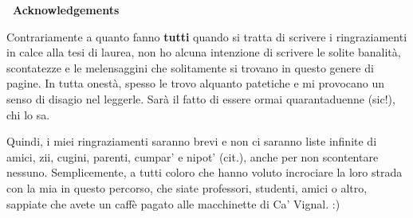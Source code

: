 \newenvironment{acknowledgements}%
{\cleardoublepage\fncyblank\null\vfill\begin{center}%
		\bfseries\Large\ Acknowledgements\end{center}}%
{\vfill\null}

\begin{titlepage}
	\begin{acknowledgements}
		Contrariamente a quanto fanno \textbf{tutti} quando si tratta di scrivere i ringraziamenti in calce alla tesi di laurea, non ho alcuna intenzione di scrivere le solite banalità, scontatezze e le melensaggini che solitamente si trovano in questo genere di pagine. In tutta onestà, spesso le trovo alquanto patetiche e mi provocano un senso di disagio nel leggerle. Sarà il fatto di essere ormai quarantaduenne (sic!), chi lo sa.
		
		\bigskip
		Quindi, i miei ringraziamenti saranno brevi e non ci saranno liste infinite di amici, zii, cugini, parenti, cumpar' e nipot' (cit.), anche per non scontentare nessuno. Semplicemente, a tutti coloro che hanno voluto incrociare la loro strada con la mia in questo percorso, che siate professori, studenti, amici o altro, sappiate che avete un caffè pagato alle macchinette di Ca' Vignal. :)
	\end{acknowledgements}
	\vfill
\end{titlepage}
\thispagestyle{empty}